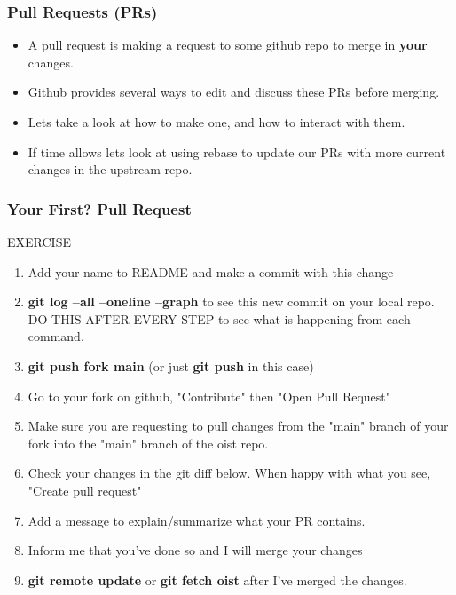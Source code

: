 \documentclass{beamer}
\begin{document}
\begin{frame}[fragile]
	\frametitle{Pull Requests (PRs)}
	\begin{itemize}
		\item A pull request is making a request to some github repo to merge in \textbf{your} changes.
		\item Github provides several ways to edit and discuss these PRs before merging.
		\item Lets take a look at how to make one, and how to interact with them.
		\item If time allows lets look at using rebase to update our PRs with more current changes in the upstream repo.
	\end{itemize}
\end{frame}

\begin{frame}[fragile]
	\frametitle{Your First? Pull Request}
	\begin{block}{EXERCISE}
		\begin{enumerate}
			\item Add your name to README and make a commit with this change
			\item \textbf{git log --all --oneline --graph} to see this new commit on your local repo. DO THIS AFTER EVERY STEP to see what is happening from each command.
			\item \textbf{git push fork main} (or just \textbf{git push} in this case)
			\item Go to your fork on github, "Contribute" then "Open Pull Request"
			\item Make sure you are requesting to pull changes from the "main" branch of your fork into the "main" branch of the oist repo.
			\item Check your changes in the git diff below. When happy with what you see, "Create pull request"
			\item Add a message to explain/summarize what your PR contains.
			\item Inform me that you've done so and I will merge your changes
			\item \textbf{git remote update} or \textbf{git fetch oist} after I've merged the changes.
		\end{enumerate}
	\end{block}
\end{frame}
\end{document}
